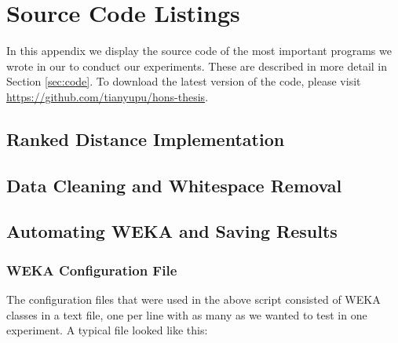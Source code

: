 \chapter{Source Code Listings}
\label{app:code}

In this appendix we display the source code of the most important programs we
wrote in our to conduct our experiments. These are described in more detail
in Section \ref{sec:code}. To download the latest version of the code, please
visit \url{https://github.com/tianyupu/hons-thesis}.


\section{Ranked Distance Implementation}
\label{sec:rankeddist-code}
\lstset{language=Java}


\section{Data Cleaning and Whitespace Removal}
\lstset{language=Python}
\label{sec:python-preprocess}


\section{Automating WEKA and Saving Results}
\label{sec:run-weka}
\lstset{language=bash}


\subsection{WEKA Configuration File}
The configuration files that were used in the above script consisted of WEKA
classes in a text file, one per line with as many as we wanted to test in one
experiment. A typical file looked like this:


